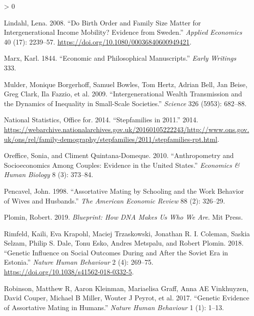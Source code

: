 \documentclass[
]{article}
\newlength{\cslhangindent}
\newenvironment{CSLReferences}[2] %
 {%
  \setlength{\parindent}{0pt}
  \ifodd #1 \everypar{\setlength{\hangindent}{\cslhangindent}}\ignorespaces\fi
  \ifnum #2 > 0
  \setlength{\parskip}{#2\baselineskip}
  \fi
 }%
 {}
\begin{document}
\begin{CSLReferences}{1}{0}
\leavevmode\hypertarget{ref-Lindahl_2008}{}%
Lindahl, Lena. 2008. {``Do Birth Order and Family Size Matter for Intergenerational Income Mobility? Evidence from Sweden.''} \emph{Applied Economics} 40 (17): 2239--57. \url{https://doi.org/10.1080/00036840600949421}.

\leavevmode\hypertarget{ref-marx1844economic}{}%
Marx, Karl. 1844. {``Economic and Philosophical Manuscripts.''} \emph{Early Writings} 333.

\leavevmode\hypertarget{ref-mulder2009intergenerational}{}%
Mulder, Monique Borgerhoff, Samuel Bowles, Tom Hertz, Adrian Bell, Jan Beise, Greg Clark, Ila Fazzio, et al. 2009. {``Intergenerational Wealth Transmission and the Dynamics of Inequality in Small-Scale Societies.''} \emph{Science} 326 (5953): 682--88.

\leavevmode\hypertarget{ref-ons2011stepfamilies}{}%
National Statistics, Office for. 2014. {``Stepfamilies in 2011.''} 2014. \url{https://webarchive.nationalarchives.gov.uk/20160105222243/http://www.ons.gov.uk/ons/rel/family-demography/stepfamilies/2011/stepfamilies-rpt.html}.

\leavevmode\hypertarget{ref-oreffice2010anthropometry}{}%
Oreffice, Sonia, and Climent Quintana-Domeque. 2010. {``Anthropometry and Socioeconomics Among Couples: Evidence in the United States.''} \emph{Economics \& Human Biology} 8 (3): 373--84.

\leavevmode\hypertarget{ref-pencavel1998assortative}{}%
Pencavel, John. 1998. {``Assortative Mating by Schooling and the Work Behavior of Wives and Husbands.''} \emph{The American Economic Review} 88 (2): 326--29.

\leavevmode\hypertarget{ref-plomin2019blueprint}{}%
Plomin, Robert. 2019. \emph{Blueprint: How DNA Makes Us Who We Are}. Mit Press.

\leavevmode\hypertarget{ref-Rimfeld_2018}{}%
Rimfeld, Kaili, Eva Krapohl, Maciej Trzaskowski, Jonathan R. I. Coleman, Saskia Selzam, Philip S. Dale, Tonu Esko, Andres Metspalu, and Robert Plomin. 2018. {``Genetic Influence on Social Outcomes During and After the Soviet Era in Estonia.''} \emph{Nature Human Behaviour} 2 (4): 269--75. \url{https://doi.org/10.1038/s41562-018-0332-5}.

\leavevmode\hypertarget{ref-robinson2017genetic}{}%
Robinson, Matthew R, Aaron Kleinman, Mariaelisa Graff, Anna AE Vinkhuyzen, David Couper, Michael B Miller, Wouter J Peyrot, et al. 2017. {``Genetic Evidence of Assortative Mating in Humans.''} \emph{Nature Human Behaviour} 1 (1): 1--13.


\end{CSLReferences}
\end{document}
